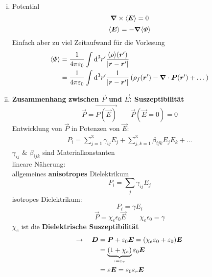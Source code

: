 \begin{enumerate}[i)]
\begin{minipage}{.5\linewidth}
\begin{tikzpicture}
		\end{tikzpicture}
	\end{minipage}%
	\item Potential
	\begin{equation*}
	\vabla \times \langle \vec{E} \rangle = 0
	\end{equation*}
	\begin{equation*}
	\langle \vec{E} \rangle = - \vabla \langle \Phi \rangle
	\end{equation*}
	Einfach aber zu viel Zeitaufwand für die Vorlesung
	\begin{align*}
	\langle \Phi \rangle &= \kq \int \dd^3  r' \frac{\langle \rho \rangle (\vec{r}')}{|\vec{r} - \vec{r}'|} \\
	&= \kq \int \dd ^3 r' \frac{1}{|\vec{r} - \vec{r}'|}\left(\rho_f(\vec{r}') - \vabla \cdot \vec{P}(\vec{r}') + \dots \right)
	\end{align*}
	\item \textbf{Zusammenhang zwischen $ \vec{P} $ und $ \vec{E} $: Suszeptibilität}
	\begin{equation*}
	\vec{P} = \vec{P(\vec{E})} \qquad \vec{P}(\vec{E} = 0) = 0
	\end{equation*}
	Entwicklung von $ \vec{P} $ in Potenzen von $ \vec{E} $:
	\begin{align*}
	P_i = \sum_{j=1}^{3} \gamma_{ij} E_j + \sum_{j,k=1}^{3} \beta_{ijk} E_j E_k + \dots
	\end{align*}
	$ \gamma_{ij} $ \& $ \beta_{ijk} $ sind Materialkonstanten\\
	lineare Näherung:\\
	allgemeines \textbf{anisotropes} Dielektrikum
	\begin{equation*}
	P_i = \sum_j \gamma_{ij} E_j
	\end{equation*}
	isotropes Dielektrikum:
	\begin{equation*}
	P_i = \gamma E_i
	\end{equation*}
	\begin{equation*}
	\vec{P} = \chi_e \epsilon_0 \vec{E} \qquad \chi_e \epsilon_0 = \gamma
	\end{equation*}
	$ \chi_e $ ist die \textbf{Dielektrische Suszeptibilität}
	\begin{align*}
	\rightarrow \quad \vec{D} &= \vec{P} + \epsilon_0 \vec{E} = (\chi_e \epsilon_0 + \epsilon_0) \vec{E} \\
	&= \ub{(1 + \chi_e)}_{\defeq \epsilon_r} \epsilon_0 \vec{E} \\
	&= \epsilon \vec{E} = \epsilon_0 \epsilon_r \vec{E}

\end{align*}
\end{enumerate}
